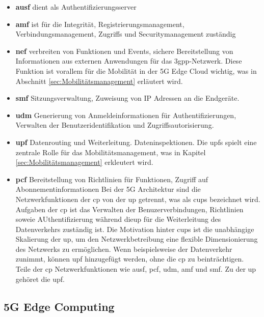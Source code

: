 \documentclass[runningheads]{llncs}
\numberwithin{figure}{section}
\begin{document}
\begin{itemize}
  \item \textbf{\acrfull{ausf}} dient als Authentifizierungsserver
  \item \textbf{\acrfull{amf}} ist für die Integrität, Registrierungsmanagement, Verbindungsmanagement,
  Zugriffs und Securitymanagement zuständig
  \item \textbf{\acrfull{nef}} verbreiten von Funktionen und Events, 
  sichere Bereitstellung von Informationen aus externen Anwendungen für das \acrshort{3gpp}-Netzwerk. Diese Funktion ist vorallem für die Mobilität
  in der 5G Edge Cloud wichtig, was in Abschnitt \ref{sec:Mobilitätsmanagement} erläutert wird.
  \item \textbf{\acrfull{smf}} Sitzungsverwaltung, Zuweisung von IP Adressen an die Endgeräte. 
  \item \textbf{\acrfull{udm}} Generierung von Anmeldeinformationen für Authentifizierungen, 
  Verwalten der Benutzeridentifikation und Zugriffsautorisierung.
  \item \textbf{\acrfull{upf}} Datenrouting und Weiterleitung. Dateninspektionen. Die \acrshort{upf}s spielt eine zentrale Rolle für das Mobilitätsmanagement, was in 
  Kapitel \ref{sec:Mobilitätsmanagement}  erkleutert wird.
  \item \textbf{\acrfull{pcf}} Bereitstellung von Richtlinien für Funktionen, 
  Zugriff auf Abonnementinformationen
Bei der 5G Architektur sind die Netzwerkfunktionen der \acrfull{cp} von der \acrfull{up} getrennt, was als \acrfull{cups} bezeichnet wird.
Aufgaben der \acrshort{cp} ist das Verwalten der Benuzerverbindungen, Richtlinien soweie AUthentifizierung während die\acrshort{up} für die 
Weiterleitung des Datenverkehrs zuständig ist.
Die Motivation hinter \acrshort{cups} ist die unabhängige Skalierung der \acrlong{up}, um den Netzwerkbetreibung eine flexible Dimensionierung
des Netzwerks zu ermöglichen. Wenn beispielsweise der Datenverkehr zunimmt, können \acrlong{upf} hinzugefügt werden, ohne die \acrlong{cp} zu beinträchtigen.
Teile der \acrshort{cp} Netzwerkfunktionen wie \acrshort{ausf}, \acrshort{pcf}, \acrshort{udm}, \acrshort{amf} und \acrshort{smf}. 
Zu der \acrshort{up} gehöret die \acrshort{upf}. 
\end{itemize}
\subsection{5G Edge Computing}
\label{subsec:5G Edge Computing}
\end{document}

